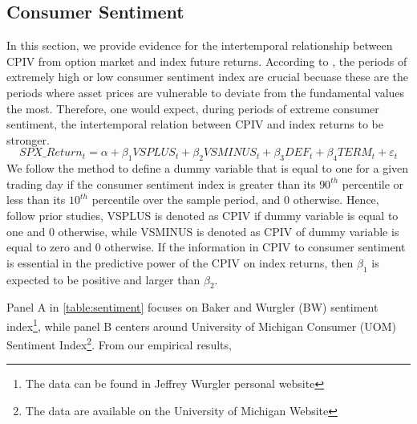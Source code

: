 
\subsection{Consumer Sentiment}
In this section, we provide evidence for the intertemporal relationship between CPIV from option market and index future returns. 
According to \textcite{atilgan2015implied}, the periods of extremely high or low consumer sentiment index are crucial becuase these are the periods where asset prices are vulnerable to deviate from the fundamental values the most. Therefore, one would expect, during periods of extreme consumer sentiment, the intertemporal relation between CPIV and index returns to be stronger.
 \begin{equation}  \label{eq:info}
SPX\_Return_{t} = \alpha + \beta _{1}VSPLUS_{t} + \beta _{2}VSMINUS_{t} + \beta _{3}DEF_{t} + \beta _{4}TERM_{t} + \varepsilon _{t}
 \end{equation}
We follow the method \parencite{atilgan2015implied} to define a dummy variable that is equal to one for a given trading day if the consumer sentiment index is greater than its $90^{th}$ percentile or less than its $10^{th}$ percentile over the sample period, and 0 otherwise. Hence, follow prior studies, VSPLUS is denoted as CPIV if dummy variable is equal to one and 0 otherwise, while VSMINUS is denoted as CPIV of dummy variable is equal to zero and 0 otherwise. If the information in CPIV to consumer sentiment is essential in the predictive power of the CPIV on index returns, then $\beta _{1}$ is expected to be positive and larger than $\beta _{2}$. 

Panel A in \autoref{table:sentiment} focuses on Baker and Wurgler (BW) sentiment index\footnote{The data can be found in Jeffrey Wurgler personal website}, while panel B centers around University of Michigan Consumer (UOM) Sentiment Index\footnote{The data are available on the University of Michigan Website}. From our empirical results, 




















